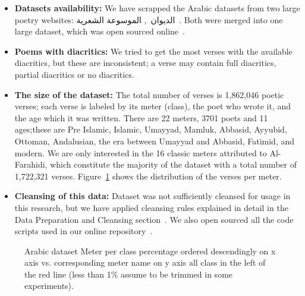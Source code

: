 \begin{itemize}

 \item \textbf{Datasets availability:} We have scrapped the Arabic datasets from two large poetry websites: \textarabic{الديوان}~\cite{diwan}, \textarabic{الموسوعة الشعرية}~\cite{PoetryEncyclopedia2016}. Both were merged into one large dataset, which was open sourced online~\cite{ArabicpoetryDS}.

 \item \textbf{Poems with diacritics:} We tried to get the most verses with the available diacritics, but these are inconsistent; a verse may contain full diacritics, partial diacritics or no diacritics.

 \item \textbf{The size of the dataset:} The total number of verses is 1,862,046 poetic verses; each verse is labeled by its meter (class), the poet who wrote it, and the age which it was written. There are 22 meters, 3701 poets and 11 ages;these are Pre Islamic, Islamic, Umayyad, Mamluk, Abbasid, Ayyubid, Ottoman, Andalusian, the era between Umayyad and Abbasid, Fatimid, and modern. We are only interested in the 16 classic meters attributed to Al-Farahidi, which constitute the majority of the dataset with a total number of 1,722,321 verses. Figure~\ref{Fig:Data_Size_Distribution} shows the distribution of the verses per meter. %
 
 \item \textbf{Cleansing of this data:} Dataset was not sufficiently cleansed for usage in this research, but we have applied cleansing rules explained in detail in the Data Preparation and Cleansing section~. We also open sourced all the code scripts used in our online repository~\cite{HCILAB_ArabicPoetry_2018}.
\end{itemize}

\begin{figure}[!t]
 \centering
 \begin{tikzpicture}
 
 \end{tikzpicture}%
 \caption{Arabic dataset Meter per class percentage ordered descendingly on x axis vs. corresponding meter name on y axis all class in the left of the red line (less than 1\% assume to be trimmed in some experiments).	}\label{Fig:Data_Size_Distribution}
\end{figure}

